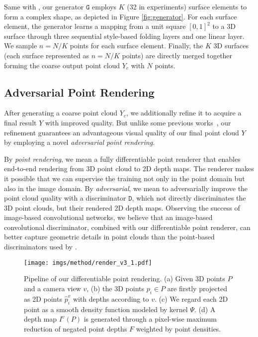 \documentclass[final]{cvpr}
\begin{document}
Same with \cite{atlasnet2018,liu2019morphing}, our generator $\mathtt{G}$ employs $K$ (32 in experiments) surface elements to form a complex shape, as depicted in Figure \ref{fig:generator}. For each surface element, the generator learns a mapping from a unit square $[0, 1]^2$ to a 3D surface through three sequential style-based folding layers and one linear layer. We sample $n=N/K$ points for each surface element. Finally, the $K$ 3D surfaces (each surface represented as $n=N/K$ points) are directly merged together forming the coarse output point cloud $Y_c$ with $N$ points.

\subsection{Adversarial Point Rendering}
\label{sec:rendering}
After generating a coarse point cloud $Y_c$, we additionally refine it to acquire a final result $Y$ with improved quality. But unlike some previous works~\cite{liu2019morphing,cascaded_2020_CVPR}, our refinement guarantees an advantageous visual quality of our final point cloud $Y$ by employing a novel \emph{adversarial point rendering}. 

By \emph{point rendering}, we mean a fully differentiable point renderer that enables end-to-end rendering from 3D point cloud to 2D depth maps. The renderer makes it possible that we can supervise the training not only in the point domain but also in the image domain. By \emph{adversarial}, we mean to adversarially improve the point cloud quality with a discriminator $\mathtt{D}$, which not directly discriminates the 3D point clouds, but their rendered 2D depth maps. Observing the success of image-based convolutional networks, we believe that an image-based convolutional discriminator, combined with our differentiable point renderer, can better capture geometric details in point clouds than the point-based discriminators used by \cite{cascaded_2020_CVPR,chen2019unpaired}. 

\begin{figure}[t]
\centering
\texttt{[image: imgs/method/render\_v3\_1.pdf]}
 \footnotesize
    \caption{Pipeline of our differentiable point rendering. (a) Given 3D points $P$ and a camera view $v$, (b) the 3D points $p_i \in P$ are firstly projected as 2D points $\hat{p}_i^v$ with depths according to $v$. (c) We regard each 2D point as a smooth density function modeled by kernel $\Psi$. (d) A depth map $I^v(P)$ is generated through a pixel-wise maximum reduction of negated point depths $F$ weighted by point densities.}
\label{fig:render}
\vspace{-1em}
\end{figure}
\end{document}
